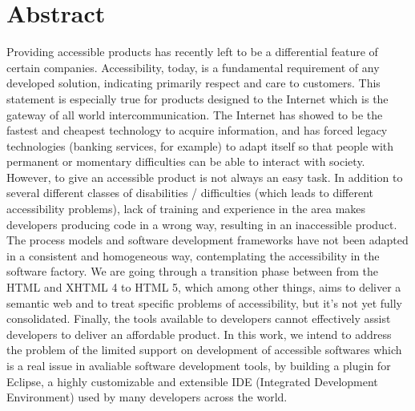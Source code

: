 \chapter*{Abstract}

Providing accessible products has recently left  to be a differential
feature of certain companies. Accessibility, today, is a fundamental requirement
of any developed solution, indicating primarily respect and care to
customers.
This statement is especially true for products designed to the Internet which is
the gateway of all  world intercommunication. The Internet has showed to be the
fastest and cheapest technology to acquire information, and has forced legacy
technologies (banking services, for example) to adapt itself so that people with
permanent or momentary difficulties can be able to interact with society.
However, to give an accessible product is not always an easy task. In addition to several different classes of disabilities / difficulties (which leads to
different accessibility problems), lack of training and experience in the area
makes developers producing code in a wrong way, resulting in an inaccessible
product.
The process models and software development frameworks have not been adapted in a
consistent and homogeneous way, contemplating the accessibility in the software
factory. We are going through a transition phase between from the HTML and
XHTML 4 to HTML 5, which among other things, aims to deliver a semantic web and
to treat specific problems of accessibility, but it's not yet fully
consolidated.
Finally, the tools available to developers cannot effectively assist developers to
deliver an affordable product. In this work, we intend to address the problem of
the limited support on development of accessible softwares which is a real issue
in avaliable software development tools, by building a plugin for Eclipse, a
highly customizable and extensible IDE (Integrated Development Environment) used
by many developers across the world.

\label{abstract}